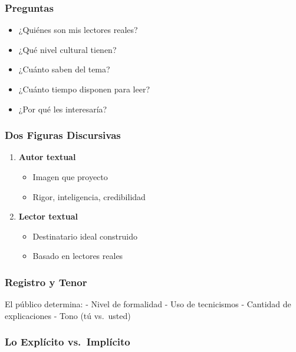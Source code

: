 \documentclass[
  11pt,
]{beaner}
\providecommand{\tightlist}{%
  \setlength{\itemsep}{0pt}\setlength{\parskip}{0pt}}
\begin{document}
\subsubsection{Preguntas}\label{preguntas}

\begin{itemize}
\tightlist
\item
  ¿Quiénes son mis lectores reales?
\item
  ¿Qué nivel cultural tienen?
\item
  ¿Cuánto saben del tema?
\item
  ¿Cuánto tiempo disponen para leer?
\item
  ¿Por qué les interesaría?
\end{itemize}

\subsubsection{Dos Figuras Discursivas}\label{dos-figuras-discursivas}

\begin{enumerate}
\def\labelenumi{\arabic{enumi}.}
\tightlist
\item
  \textbf{Autor textual}

  \begin{itemize}
  \tightlist
  \item
    Imagen que proyecto
  \item
    Rigor, inteligencia, credibilidad
  \end{itemize}
\item
  \textbf{Lector textual}

  \begin{itemize}
  \tightlist
  \item
    Destinatario ideal construido
  \item
    Basado en lectores reales
  \end{itemize}
\end{enumerate}

\subsubsection{Registro y Tenor}\label{registro-y-tenor}

El público determina: - Nivel de formalidad - Uso de tecnicismos -
Cantidad de explicaciones - Tono (tú vs.~usted)

\subsubsection{Lo Explícito
vs.~Implícito}\label{lo-expluxedcito-vs.-impluxedcito}
\end{document}
